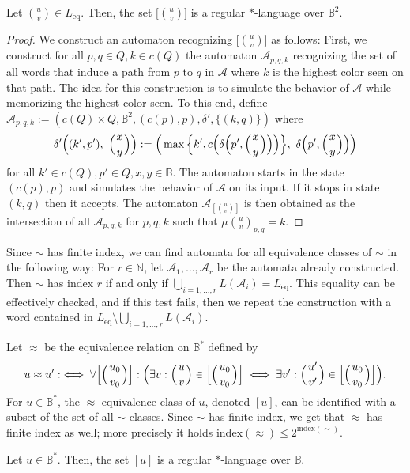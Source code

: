 \documentclass[fleqn,envcountsame]{LMCS}
\newcommand{\aut}[1]{\ensuremath{\mathcal{#1}}}
\newcommand{\Leq}{\ensuremath{L_{\mathrm{eq}}}\xspace}
\newcommand{\Nat}{\ensuremath{\mathbb{N}}\xspace}
\newcommand{\B}{\ensuremath{\mathbb{B}}\xspace}
\newcommand{\Bst}{\ensuremath{\mathbb{B}^*}\xspace}
\newcommand{\Bsq}{\ensuremath{\mathbb{B}^2}\xspace}
\newcommand{\Index}{\mathrm{index}}
\let\obinom\binom
\renewcommand\binom[2]{
  \Big( { {{#1}} \atop {{#2}} } \Big)
}
\begin{document}
\begin{lem}\label{lem:sim_regular_class}
Let $\obinom{u}{v}\in\Leq$. Then, the set $\big[\obinom{u}{v}\big]$
is a regular $*$-language over \Bsq.
\end{lem}

\begin{proof}
We construct an automaton recognizing $\big[\obinom{u}{v}\big]$ as follows:
First, we construct for all $p,q\in Q,k\in c(Q)$ the automaton
$\aut{A}_{p,q,k}$ recognizing the set of all words that induce a path
from $p$ to $q$ in \aut{A} where $k$ is the highest color seen on that
path. The idea for this construction is to simulate the behavior of
\aut{A} while memorizing the highest color seen. To this end, define
$\aut{A}_{p,q,k}:=(c(Q)\times Q,\Bsq,(c(p),p),\delta',\{(k,q)\})$
where
\[ \delta'\Big((k',p'),\ \binom{x}{y}\Big) :=
  \Big(\max \Big\{ k',c\Big( \delta\Big(p', \binom{x}{y}\Big)\Big) \Big\},\
      \delta \Big(p', \binom{x}{y}\Big)\Big)
\]
for all $k'\in c(Q),p'\in Q,x,y\in\B$. The automaton starts in the state
$(c(p),p)$ and simulates the behavior of \aut{A} on its input. If it
stops in state $(k,q)$ then it accepts. The automaton $\aut{A}_{[\obinom{u}{v}]}$
is then obtained as the intersection of all $\aut{A}_{p,q,k}$ for $p,q,k$
such that  $\mu\obinom{u}{v}_{p,q}=k$. 
\end{proof}

Since $\sim$ has finite index, we can find automata for all equivalence
classes of $\sim$ in the following way: For $r\in\Nat$, let
$\aut{A}_1,\ldots,\aut{A}_r$ be the automata already constructed.
Then $\sim$ has index $r$ if and only if
$\bigcup_{i=1,\ldots,r}L(\aut{A}_i)=\Leq$.
This equality can be effectively checked, and if this test fails,
then we repeat the construction with a word contained in
$\Leq\setminus\bigcup_{i=1,\ldots,r}L(\aut{A}_i)$.

Let $\approx$ be
the equivalence relation on \Bst defined by
\[
 u \approx u' :\iff \forall \Big[\binom{u_0}{v_0}\Big]:
   \Big( \exists v: \binom{u}{v} \in \Big[ \binom{u_0}{v_0} \Big]
     \iff \exists v': \binom{u'}{v'} \in \Big[ \binom{u_0}{v_0} \Big]\Big).
\]
For $u\in\Bst$, the $\approx$-equivalence class of $u$, denoted $[u]$,
can be identified with a subset of the set of all $\sim$-classes.
Since $\sim$ has finite index, we get that $\approx$ has finite index as well;
more precisely it holds $\Index(\approx)\leq2^{\Index(\sim)}$.

\begin{lem}\label{lem:approx_regular_class}
Let $u\in\Bst$. Then, the set $[u]$ is a regular $*$-language over \B.
\end{lem}
\end{document}
